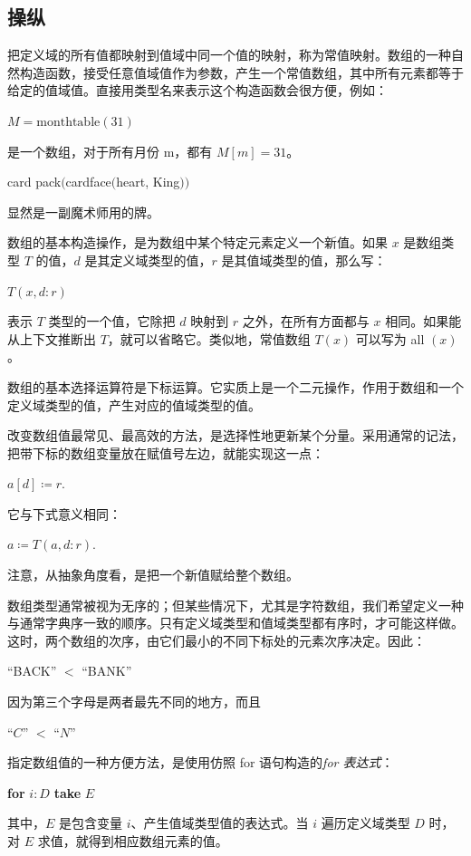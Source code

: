 \documentclass[twoside,11pt,fontset=none]{ctexbook}
\begin{document}
\subsection{操纵}

把定义域的所有值都映射到值域中同一个值的映射，称为常值映射。数组的一种自然构造函数，接受任意值域值作为参数，产生一个常值数组，其中所有元素都等于给定的值域值。直接用类型名来表示这个构造函数会很方便，例如：

\quad $M = \text{monthtable}(31)$

\noindent
是一个数组，对于所有月份 m，都有 $M[m] = 31$。

\quad card pack$($cardface$($heart, King$))$

\noindent
显然是一副魔术师用的牌。

数组的基本构造操作，是为数组中某个特定元素定义一个新值。如果 $x$ 是数组类型 $T$ 的值，$d$ 是其定义域类型的值，$r$ 是其值域类型的值，那么写：

\quad $T(x, d:r)$

\noindent
表示 $T$ 类型的一个值，它除把 $d$ 映射到 $r$ 之外，在所有方面都与 $x$ 相同。如果能从上下文推断出 $T$，就可以省略它。类似地，常值数组 $T(x)$ 可以写为 all $(x)$。

数组的基本选择运算符是下标运算。它实质上是一个二元操作，作用于数组和一个定义域类型的值，产生对应的值域类型的值。

改变数组值最常见、最高效的方法，是选择性地更新某个分量。采用通常的记法，把带下标的数组变量放在赋值号左边，就能实现这一点：

\quad $a[d]\coloneq r.$

\noindent
它与下式意义相同：

\quad $a\coloneq T(a, d:r).$

\noindent
注意，从抽象角度看，是把一个新值赋给整个数组。

数组类型通常被视为无序的；但某些情况下，尤其是字符数组，我们希望定义一种与通常字典序一致的顺序。只有定义域类型和值域类型都有序时，才可能这样做。这时，两个数组的次序，由它们最小的不同下标处的元素次序决定。因此：

\quad ``BACK'' $<$ ``BANK''

\noindent
因为第三个字母是两者最先不同的地方，而且

\quad ``$C$'' $<$ ``$N$''

指定数组值的一种方便方法，是使用仿照 for 语句构造的\textit{for 表达式}：

\quad \textbf{for} $i:D$ \textbf{take} $E$

\noindent
其中，$E$ 是包含变量 $i$、产生值域类型值的表达式。当 $i$ 遍历定义域类型 $D$ 时，对 $E$ 求值，就得到相应数组元素的值。
\end{document}
